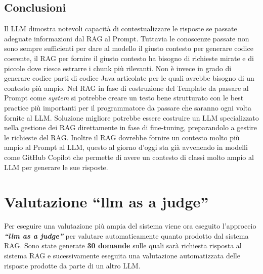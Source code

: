 \documentclass[12pt,a4paper,openright,twoside]{book}
\begin{document}
\subsection{Conclusioni}
Il LLM dimostra notevoli capacità di contestualizzare le risposte se passate adeguate informazioni dal RAG al Prompt.
Tuttavia le conoscenze passate non sono sempre sufficienti per dare al modello il giusto contesto per generare codice coerente,
il RAG per fornire il giusto contesto ha bisogno di richieste mirate e di piccole dove riesce estrarre i chunk più rilevanti.
Non è invece in grado di generare codice parti di codice Java articolate per le quali avrebbe bisogno di un contesto più ampio.
Nel RAG in fase di costruzione del Template da passare al Prompt come \emph{system} si potrebbe creare un testo bene strutturato con le best practice più importanti per il programmatore da passare che saranno ogni volta fornite al LLM.
Soluzione migliore potrebbe essere costruire un LLM specializzato nella gestione dei RAG direttamente in fase di fine-tuning, preparandolo a gestire le richieste del RAG.
Inoltre il RAG dovrebbe fornire un contesto molto più ampio al Prompt al LLM, questo al giorno d'oggi sta già avvenendo in modelli come GitHub Copilot che permette di avere un contesto di classi molto ampio al LLM 
per generare le sue risposte.
\section{Valutazione ``llm as a judge''}
Per eseguire una valutazione più ampia del sistema viene ora eseguito l'approccio \textbf{\emph{``llm as a judge''}} per valutare automaticamente quanto prodotto dal sistema RAG.
Sono state generate \textbf{30 domande} sulle quali sarà richiesta risposta al sistema RAG e sucessivamente eseguita una valutazione automatizzata delle risposte prodotte da parte di un altro LLM.
\end{document}
